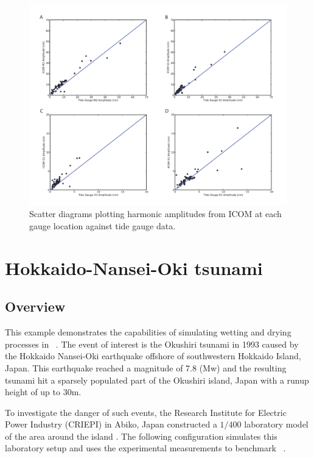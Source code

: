 \begin{figure}[t]
\centering
\includegraphics[width=\textwidth]{./examples_images/tides_in_the_Mediterranean_Sea/plots}
\caption{Scatter diagrams plotting harmonic amplitudes from ICOM at each gauge location against tide gauge data.} 
\label{plots}
\end{figure}



\section{Hokkaido-Nansei-Oki tsunami}
\label{sec:hokkaido-nansei-oki_tsunami}

\subsection{Overview}
This example demonstrates the capabilities of simulating wetting and drying processes in \fluidity\ .
The event of interest is the Okushiri tsunami in 1993 caused by the Hokkaido Nansei-Oki earthquake offshore of southwestern Hokkaido Island, Japan. 
This earthquake reached a magnitude of 7.8 (Mw) and the resulting tsunami hit a sparsely populated part of the Okushiri island, Japan with a runup height of up to 30m.

To investigate the danger of such events, the Research Institute for Electric Power Industry (CRIEPI) in Abiko, Japan constructed a $1/400$ laboratory model of the area around the island \cite{liu2008advanced}. 
The following configuration simulates this laboratory setup and uses the experimental measurements to benchmark \fluidity\ .

